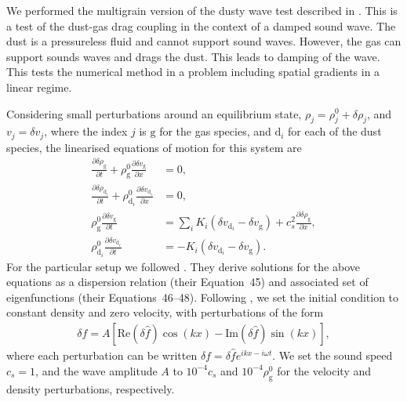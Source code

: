 \documentclass[fleqn,usenatbib]{mnras}
\newcommand{\g}{\mathrm{g}}
\newcommand{\dd}{\mathrm{d}}
\begin{document}
We performed the multigrain version of the dusty wave test described in
\citet{Laibe2011MNRAS.418.1491L}. This is a test of the dust-gas drag coupling
in the context of a damped sound wave. The dust is a pressureless fluid and
cannot support sound waves. However, the gas can support sounds waves and drags
the dust. This leads to damping of the wave. This tests the numerical
method in a problem including spatial gradients in a linear regime.

Considering small perturbations around an equilibrium state, \(\rho_j = \rho_j^0
+ \delta \rho_j\), and \(v_j = \delta v_j\), where the index \(j\) is \(\g\) for
the gas species, and \(\dd_i\) for each of the dust species, the linearised
equations of motion for this system are
%
\begin{align}
   \frac{\partial \delta \rho_{\g}}{\partial t}
      + \rho_{\g}^0 \frac{\partial \delta v_{\g}}{\partial x} &= 0, \\
   \frac{\partial \delta \rho_{\dd_i}}{\partial t}
      + \rho_{\dd_i}^0 \frac{\partial \delta v_{\dd_i}}{\partial x} &= 0, \\
   \rho_{\g}^0 \frac{\partial \delta v_{\g}}{\partial t}
      &= \sum_i K_i \left(\delta v_{\dd_i} - \delta v_{\g} \right)
         + c_s^2 \frac{\partial \delta \rho_{\g}}{\partial x}, \\
   \rho_{\dd_i}^0 \frac{\partial \delta v_{\dd_i}}{\partial t}
      &= - K_i \left(\delta v_{\dd_i} - \delta v_{\g}\right).
\end{align}
%
For the particular setup we followed \citet{Benitez-Llambay2019ApJS..241...25B}.
They derive solutions for the above equations as a dispersion relation (their
Equation~45) and associated set of eigenfunctions (their Equations~46--48).
Following \citet{Benitez-Llambay2019ApJS..241...25B}, we set the initial
condition to constant density and zero velocity, with perturbations of the form
%
\begin{align}
   \delta f = A \left[\mathrm{Re} \left(\delta \hat{f} \right) \cos(kx)
      - \mathrm{Im} \left(\delta \hat{f} \right) \sin(kx) \right],
\end{align}
%
where each perturbation can be written \(\delta f = \delta \hat{f} e^{ikx -
i\omega t}\). We set the sound speed \(c_s = 1\), and the wave amplitude \(A\)
to \(10^{-4} c_s\) and \(10^{-4} \rho_{\g}^0\) for the velocity and density
perturbations, respectively.
\end{document}
